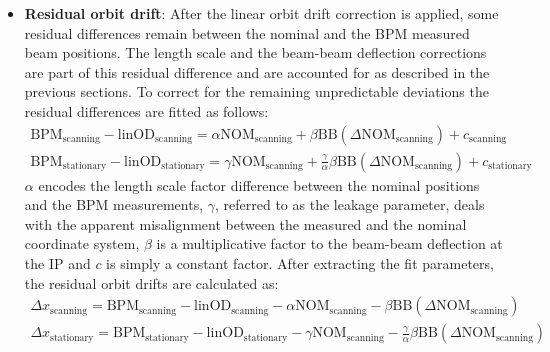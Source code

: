\begin{itemize}
	\item \textbf{Residual orbit drift}: After the linear orbit drift correction is applied, some residual differences remain between the nominal and the BPM measured beam positions. The length scale and the beam-beam deflection corrections are part of this residual difference and are accounted for as described in the previous sections. To correct for the remaining unpredictable deviations the residual differences are fitted as follows:
    \begin{gather}
    \mathrm{BPM}_{\mathrm{scanning}} - \mathrm{linOD}_{\mathrm{scanning}} = \alpha \mathrm{NOM}_{\mathrm{scanning}} + \beta \mathrm{BB}(\Delta\mathrm{NOM_{\mathrm{scanning}}}) + c_{\mathrm{scanning}} \\
    \mathrm{BPM}_{\mathrm{stationary}} - \mathrm{linOD}_{\mathrm{stationary}} = \gamma \mathrm{NOM}_{\mathrm{scanning}} + \frac{\gamma}{\alpha} \beta \mathrm{BB}(\Delta\mathrm{NOM}_{\mathrm{scanning}}) + c_{\mathrm{stationary}}
    \end{gather}
    $\alpha$ encodes the length scale factor difference between the nominal positions and the BPM measurements, $\gamma$, referred to as the leakage parameter, deals with the apparent misalignment between the measured and the nominal coordinate system, $\beta$ is a multiplicative factor to the beam-beam deflection at the IP and $c$ is simply a constant factor. After extracting the fit parameters, the residual orbit drifts are calculated as:
    \begin{gather}
    \Delta x_{\mathrm{scanning}} = \mathrm{BPM}_{\mathrm{scanning}} - \mathrm{linOD}_{\mathrm{scanning}} - \alpha \mathrm{NOM}_{\mathrm{scanning}} - \beta \mathrm{BB}(\Delta\mathrm{NOM_{\mathrm{scanning}}}) \\
    \Delta x_{\mathrm{stationary}} = \mathrm{BPM}_{\mathrm{stationary}} - \mathrm{linOD}_{\mathrm{stationary}} - \gamma \mathrm{NOM}_{\mathrm{scanning}} - \frac{\gamma}{\alpha} \beta \mathrm{BB}(\Delta\mathrm{NOM}_{\mathrm{scanning}})
    \end{gather}


\end{itemize}
